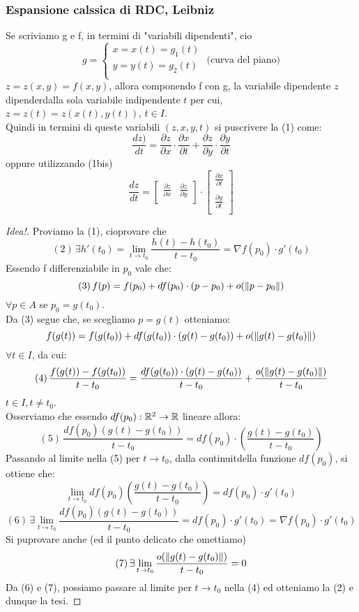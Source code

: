 \subsubsection{Espansione calssica di RDC, Leibniz}
Se scriviamo g e f, in termini di "variabili dipendenti", cio\ace 
$$g = \left\{\begin{array}{l}
  x = x(t) = g_1(t) \\
  y = y(t) = g_2(t) \\
\end{array}\right. \text{ (curva del piano)}$$
$z = z(x,y) = f(x,y)$, allora componendo f con g, la variabile dipendente $z$ dipender\aca dalla sola variabile
indipendente $t$ per cui, $z = z(t) = z(x(t),y(t))$, $t \in I$. \\
Quindi in termini di queste variabili $(z,x,y,t)$ si pu\aco scrivere la (1) come:
$$\frac{dz)}{dt} = \frac{\partial z}{\partial x} \cdot \frac{\partial x}{\partial t} + \frac{\partial z}{\partial y} \cdot \frac{\partial y}{\partial t}$$
oppure utilizzando (1bis)
$$\frac{dz}{dt} = \begin{bmatrix}
  \frac{\partial z}{\partial x} & \frac{\partial z}{\partial y}\\
\end{bmatrix} \cdot \begin{bmatrix}
  \frac{\partial x}{\partial t} \\ 
  \\
  \frac{\partial y}{\partial t}\\
\end{bmatrix}$$
\begin{proof}[Idea!]
  Proviamo la (1), cio\ace provare che 
  $$(2) \, \exists h'(t_0) = \lim_{t\to t_0} \frac{h(t)-h(t_0)}{t-t_0} = \nabla f(p_0)\cdot g'(t_0)$$
  Essendo f differenziabile in $p_0$ vale che:
  $$(3) \, f(p) = f(p_0) + df(p_0)\cdot(p-p_0) + o(\left\lVert p-p_0\right\rVert)$$
  $\forall p \in A$ se $p_0 = g(t_0)$. \\
  Da (3) segue che, se scegliamo $p = g(t)$ otteniamo:
  $$f(g(t)) = f(g(t_0)) + df(g(t_0))\cdot (g(t)-g(t_0)) + o (\left\lVert g(t)-g(t_0)\right\rVert)$$
  $\forall t \in I$, da cui:
  $$(4)\, \frac{f(g(t)) - f(g(t_0))}{t-t_0} = \frac{df(g(t_0))\cdot (g(t)-g(t_0))}{t-t_0} + \frac{o (\left\lVert g(t)-g(t_0)\right\rVert)}{t-t_0}$$
  $t \in I, t \neq t_0$. \\
  Osserviamo che essendo $df(p_0): \mathbb{R}^2 \to \mathbb{R}$ lineare allora:
  $$(5)\, \frac{df(p_0)(g(t)-g(t_0))}{t-t_0} = df(p_0)\cdot \left(\frac{g(t)-g(t_0)}{t-t_0}\right)$$
  Passando al limite nella (5) per $t \to t_0$, dalla continuit\aca della funzione $df(p_0)$, si ottiene che:
  $$\lim_{t\to t_0} df(p_0)\left(\frac{g(t)-g(t_0)}{t-t_0}\right) = df(p_0)\cdot g'(t_0)$$
  $$(6) \, \exists \lim_{t \to t_0} \frac{df(p_0)(g(t)-g(t_0))}{t-t_0} = df(p_0)\cdot g'(t_0) = \nabla f(p_0)\cdot g'(t_0)$$
  Si pu\aco provare anche (ed \ace il punto delicato che omettiamo)
  $$(7) \, \exists \lim_{t\to t_0} \frac{o(\left\lVert g(t)-g(t_0)\right\rVert)}{t-t_0} = 0$$
  Da (6) e (7), possiamo passare al limite per $t \to t_0$ nella (4) ed otteniamo la (2) e dunque la tesi.
\end{proof}
